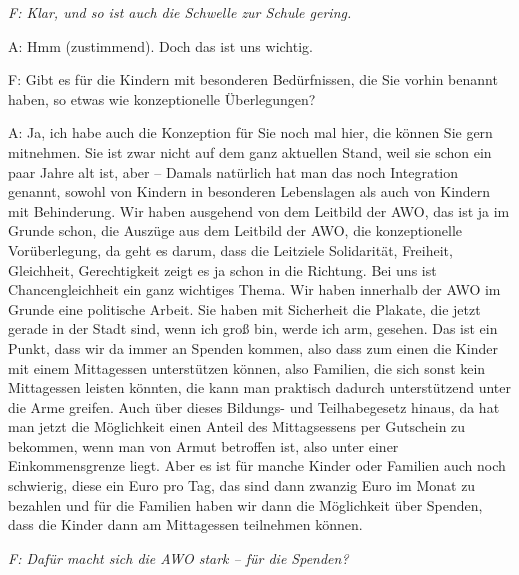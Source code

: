 \emph{F: Klar, und so ist auch die Schwelle zur Schule gering.}

A: Hmm (zustimmend). Doch das ist uns wichtig.

{F: Gibt es für die Kindern mit besonderen Bedürfnissen, die Sie vorhin benannt haben, so etwas wie konzeptionelle Überlegungen?}

A: Ja, ich habe auch die Konzeption für Sie noch mal hier, die können Sie gern mitnehmen. Sie ist zwar nicht auf dem ganz aktuellen Stand, weil sie schon ein paar Jahre alt ist, aber -- Damals natürlich hat man das noch Integration genannt, sowohl von Kindern in besonderen Lebenslagen als auch von Kindern mit Behinderung. Wir haben ausgehend von dem Leitbild der AWO, das ist ja im Grunde schon, die Auszüge aus dem Leitbild der AWO, die konzeptionelle Vorüberlegung, da geht es darum, dass die Leitziele Solidarität, Freiheit, Gleichheit, Gerechtigkeit zeigt es ja schon in die Richtung. Bei uns ist Chancengleichheit ein ganz wichtiges Thema. Wir haben innerhalb der AWO im Grunde eine politische Arbeit. Sie haben mit Sicherheit die Plakate, die jetzt gerade in der Stadt sind, wenn ich groß bin, werde ich arm, gesehen. Das ist ein Punkt, dass wir da immer an Spenden kommen, also dass zum einen die Kinder mit einem Mittagessen unterstützen können, also Familien, die sich sonst kein Mittagessen leisten könnten, die kann man praktisch dadurch unterstützend unter die Arme greifen. Auch über dieses Bildungs- und Teilhabegesetz hinaus, da hat man jetzt die Möglichkeit einen Anteil des Mittagsessens per Gutschein zu bekommen, wenn man von Armut betroffen ist, also unter einer Einkommensgrenze liegt. Aber es ist für manche Kinder oder Familien auch noch schwierig, diese ein Euro pro Tag, das sind dann zwanzig Euro im Monat zu bezahlen und für die Familien haben wir dann die Möglichkeit über Spenden, dass die Kinder dann am Mittagessen teilnehmen können. 

\emph{F: Dafür macht sich die AWO stark -- für die Spenden?}

